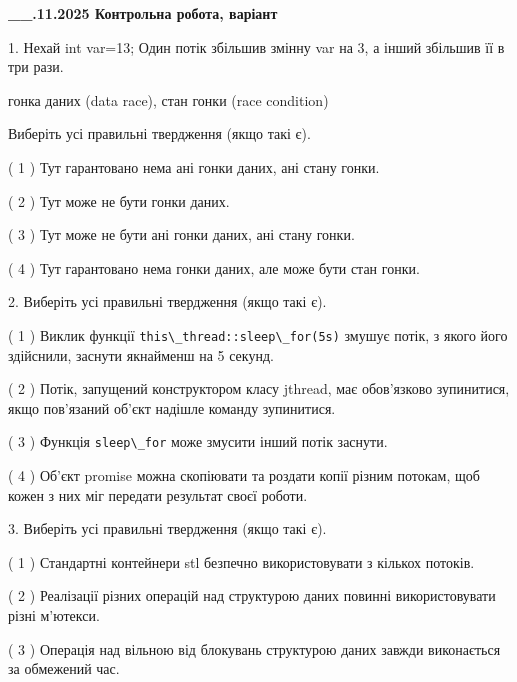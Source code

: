 \documentclass[12pt, ukrainian]{article}
\def\code#1{\Verb!#1!}
\begin{document}
\newpage
\begin {large}

\textbf{\_\_.11.2025 Контрольна робота, варіант  }\par


{
1. Нехай int var=13; Один потік збільшив змінну var на 3, а інший збільшив її в три рази.

гонка даних (data race), стан гонки (race condition)

Виберіть усі правильні твердження (якщо такі є).\par
\vspace{2mm}
( 1 ) Тут гарантовано нема ані гонки даних, ані стану гонки.%

( 2 ) Тут може не бути гонки даних.%

( 3 ) Тут може не бути ані гонки даних, ані стану гонки.%

( 4 ) Тут гарантовано нема гонки даних, але може бути стан гонки.%


2. Виберіть усі правильні твердження (якщо такі є).\par
\vspace{2mm}

( 1 ) Виклик функції \code{this\_thread::sleep\_for(5s)} змушує потік, з якого його здійснили, заснути якнайменш на 5 секунд.%

( 2 ) Потік, запущений конструктором класу jthread, має обов’язково зупинитися, якщо пов’язаний об’єкт надішле команду зупинитися.%

( 3 ) Функція \code{sleep\_for} може змусити інший потік заснути.%

( 4 ) Об’єкт promise можна скопіювати та роздати копії різним потокам, щоб кожен з них міг передати результат своєї роботи.%


3. Виберіть усі правильні твердження (якщо такі є).\par
\vspace{2mm}

( 1 ) Стандартні контейнери stl безпечно використовувати з кількох потоків.%

( 2 ) Реалізації різних операцій над структурою даних повинні використовувати різні м’ютекси.%

( 3 ) Операція над вільною від блокувань структурою даних завжди виконається за обмежений час.%

}
\end{large}
\end{document}
